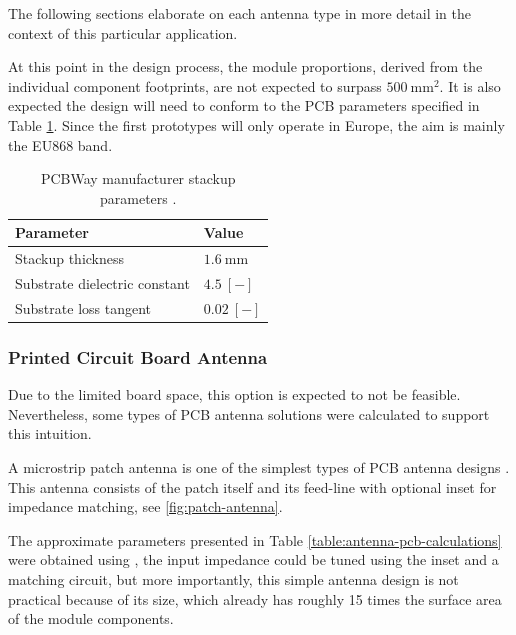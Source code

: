 The following sections elaborate on each antenna type in more detail in the context of this particular application. 

At this point in the design process, the module proportions, derived from the individual component footprints, are not expected to surpass $500~\mathrm{mm^2}$. It is also expected the design will need to conform to the PCB parameters specified in Table \ref{table:pcb-parameters}. Since the first prototypes will only operate in Europe, the aim is mainly the EU868 band.

\begin{table}[H]
\begin{center}
\caption{\label{table:pcb-parameters}PCBWay manufacturer stackup parameters \cite{pcbway_stackup_2024}.}
    \begin{tabular}{|l|l|} \hline
    \textbf{Parameter}            & \textbf{Value} \\ \hline
    Stackup thickness             & $1.6~\mathrm{mm}$ \\ \hline
    Substrate dielectric constant & $4.5~\mathrm{[-]}$ \\ \hline
    Substrate loss tangent        & $0.02~\mathrm{[-]}$ \\ \hline
    \end{tabular}
\end{center}
\end{table}

\subsubsection{Printed Circuit Board Antenna}
Due to the limited board space, this option is expected to not be feasible. Nevertheless, some types of PCB antenna solutions were calculated to support this intuition.

A microstrip patch antenna is one of the simplest types of PCB antenna designs \cite{zachariah_peterson_microstrip_2022,wallace_an058_nodate}. This antenna consists of the patch itself and its feed-line with optional inset for impedance matching, see \ref{fig:patch-antenna}. 

The approximate parameters presented in Table \ref{table:antenna-pcb-calculations} were obtained using \cite{zachariah_peterson_microstrip_2022}, the input impedance could be tuned using the inset and a matching circuit, but more importantly, this simple antenna design is not practical because of its size, which already has roughly 15 times the surface area of the module components.

